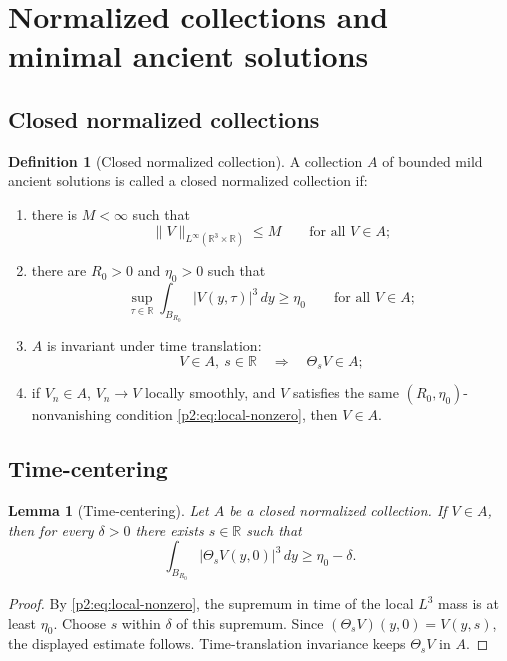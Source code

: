 \documentclass[11pt]{amsart}
\theoremstyle{plain}
\newtheorem{lemma}[lemma]{Lemma}
\theoremstyle{definition}
\newtheorem{definition}[definition]{Definition}
\theoremstyle{remark}
\numberwithin{equation}{section}
\newcommand{\R}{\mathbb R}
\begin{document}
\section{Normalized collections and minimal ancient solutions}
\label{p2:sec:minimal-elements}

\subsection{Closed normalized collections}

\begin{definition}[Closed normalized collection]\label{p2:def:closed-normalized}
A collection \(A\) of bounded mild ancient solutions is called a closed
normalized collection if:
\begin{enumerate}[label=\textup{(\roman*)}]
\item there is \(M<\infty\) such that
\[
   \|V\|_{L^\infty(\R^3\times\R)}\le M
   \qquad\text{for all }V\in A;
\]
\item there are \(R_0>0\) and \(\eta_0>0\) such that
\begin{equation}\label{p2:eq:local-nonzero}
   \sup_{\tau\in\R}
   \int_{B_{R_0}}|V(y,\tau)|^3\,dy
   \ge \eta_0
   \qquad\text{for all }V\in A;
\end{equation}
\item \(A\) is invariant under time translation:
\[
   V\in A,\ s\in\R
   \quad\Longrightarrow\quad
   \Theta_sV\in A;
\]
\item if \(V_n\in A\), \(V_n\to V\) locally smoothly, and \(V\) satisfies the
same \((R_0,\eta_0)\)-nonvanishing condition \eqref{p2:eq:local-nonzero}, then
\(V\in A\).
\end{enumerate}
\end{definition}

\subsection{Time-centering}

\begin{lemma}[Time-centering]\label{p2:lem:time-centering}
Let \(A\) be a closed normalized collection.  If \(V\in A\), then for every
\(\delta>0\) there exists \(s\in\R\) such that
\[
   \int_{B_{R_0}}|\Theta_sV(y,0)|^3\,dy
   \ge \eta_0-\delta.
\]
\end{lemma}

\begin{proof}
By \eqref{p2:eq:local-nonzero}, the supremum in time of the local \(L^3\) mass is
at least \(\eta_0\).  Choose \(s\) within \(\delta\) of this supremum.  Since
\((\Theta_sV)(y,0)=V(y,s)\), the displayed estimate follows.  Time-translation
invariance keeps \(\Theta_sV\) in \(A\).
\end{proof}
\end{document}
